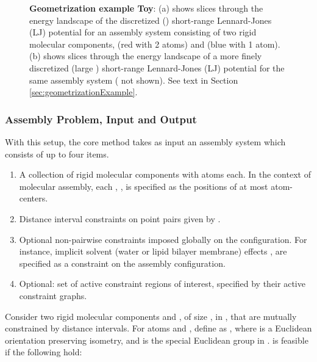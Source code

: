 \documentclass[]{article}
\newcommand{\rmc}{rigid molecular component}
\newcommand{\toythreed}{Toy}
\begin{document}
\begin{figure}[htpb]
\centering
{}
\caption{\scriptsize \textbf{Geometrization example \toythreed}: 
(a) shows slices through the energy landscape of the discretized () short-range Lennard-Jones
(LJ) potential for an assembly system consisting of two \rmc s,  (red with 2
atoms) and  (blue with 1 atom).  
(b) shows slices through the energy landscape of a more finely 
discretized (large ) short-range Lennard-Jones
(LJ) potential for the same assembly system ( not shown).
See text in Section \ref{sec:geometrizationExample}.
}
\label{fig:geometrizationExample}
\end{figure}


\subsubsection{Assembly Problem, Input and Output}
\label{sec:methods:furtherIO}
\noindent With this setup, the core method takes as input an assembly system which
consists of up to four items.
\begin{enumerate}
\item A collection of  \rmc s with  atoms each. In the
context of molecular assembly, each , , is specified as the
positions of at most  atom-centers.

\item Distance interval constraints on point pairs  given by .

\item Optional non-pairwise constraints imposed globally on the configuration. For
instance, implicit solvent (water or lipid bilayer membrane) effects
\cite{Lazaridis_Karplus_1999, Lazaridis_2003, Im_Feig_Brooks_2003}, are
specified as a constraint on the assembly configuration.

\item Optional: set of active constraint regions of interest, specified 
by their active constraint graphs.

\end{enumerate}

Consider two \rmc s  and , of size , in , that are
mutually constrained by distance intervals. For atoms  and , define
 as , where 
 is a Euclidean orientation preserving isometry, and  is
the special Euclidean group in .
 is feasible if the following hold:
\end{document}
